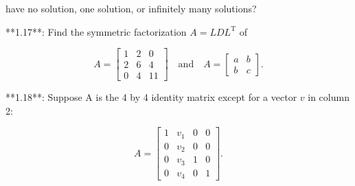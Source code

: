 have no solution, one solution, or infinitely many solutions?

**1.17**: Find the symmetric factorization \(A=LDL^{\text{T}}\) of

\[A=\begin{bmatrix}1&2&0\\ 2&6&4\\ 0&4&11\end{bmatrix}\quad\text{and}\quad A=\begin{bmatrix}a&b\\ b&c\end{bmatrix}.\]

**1.18**: Suppose A is the 4 by 4 identity matrix except for a vector \(v\) in column 2:

\[A=\begin{bmatrix}1&v_{1}&0&0\\ 0&v_{2}&0&0\\ 0&v_{3}&1&0\\ 0&v_{4}&0&1\end{bmatrix}.\] 